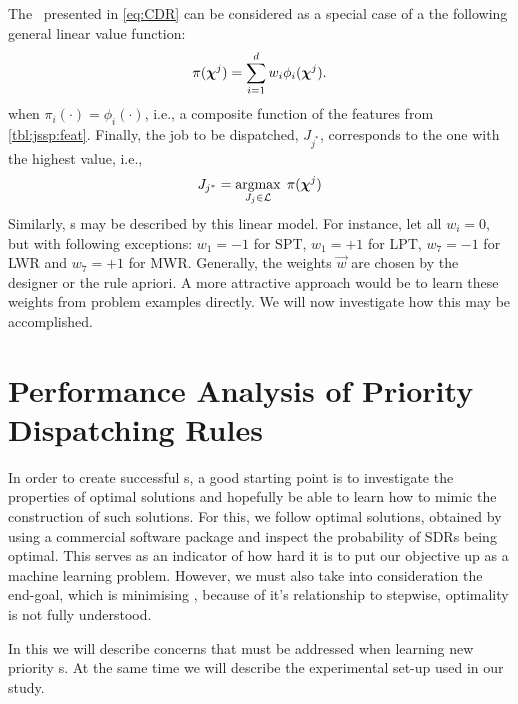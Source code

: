 \documentclass[smallextended]{svjour3}
\begin{document}
	The \cdr\ presented in \cref{eq:CDR} can be considered as a special case of a 
	the following general linear value function:
	\begin{equation}\label{eq:jssp:linweights}
	\pi(\bm \chi^j)=\sum_{i=1}^d w_i \phi_i(\bm \chi^j).
	\end{equation}
	when $\pi_i(\cdot)=\phi_i(\cdot)$, i.e., a composite function of the features 
	from \cref{tbl:jssp:feat}. Finally, the job to be dispatched, $J_{j^*}$, 
	corresponds to the one with the highest value, i.e.,
	\begin{equation}\label{eq:jstar}
	J_{j^*}=\mathop{\rm argmax}_{J_j\in \mathcal{L}}\; \pi(\bm \chi^j)
	\end{equation}
	Similarly, \sdr s may be described by this linear model. For instance, let all 
	$w_i=0$, but with following exceptions: $w_1=-1$ for SPT, $w_1=+1$ for LPT, 
	$w_7=-1$ for LWR and $w_7=+1$ for MWR. Generally, the weights $\vec{w}$ are 
	chosen by the designer or the 
	rule apriori.  A more attractive approach would be to learn these weights from 
	problem examples directly. We will now investigate how this may be accomplished.
	
	\section{Performance Analysis of Priority Dispatching Rules}\label{sec:learnOPT}
	
	In order to create successful \dr s, a good starting point is to 
	investigate the properties of optimal solutions and hopefully be able to learn 
	how to mimic the construction of such solutions. For this, we follow optimal solutions, 
	obtained by using a commercial software package \cite{gurobi} and inspect 
	the probability of SDRs being optimal. This serves as an indicator of how hard 
	it is to put our objective up as a machine learning problem. 
	However, we must also take into consideration the end-goal, which is minimising 
	\namerho, because of it's relationship to stepwise, optimality is not fully 
	understood.
	
	
	In this  we will describe concerns that must be 
	addressed when learning new priority \dr s. At the same time we will describe 
	the experimental set-up used in our study. 
	
\end{document}
